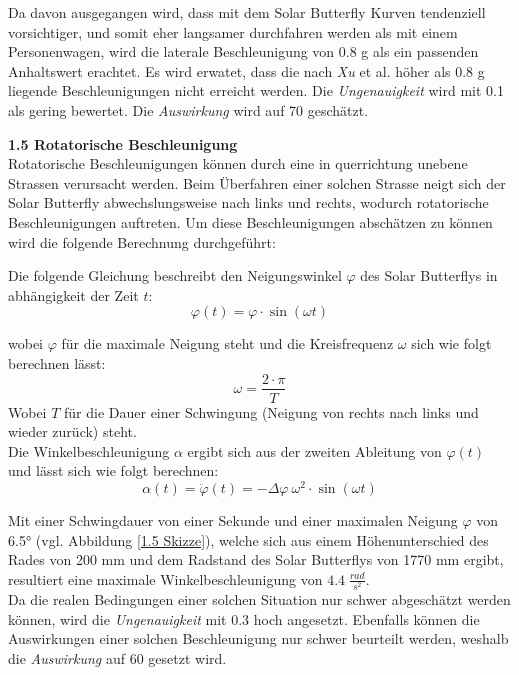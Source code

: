 \begin{description}
    Da davon ausgegangen wird, dass mit dem Solar Butterfly Kurven tendenziell vorsichtiger, und somit eher langsamer durchfahren werden als mit einem Personenwagen, wird die laterale Beschleunigung von 0.8 g als ein passenden Anhaltswert erachtet. Es wird erwatet, dass die nach \emph{Xu} et al. höher als 0.8 g liegende Beschleunigungen nicht erreicht werden. Die \emph{Ungenauigkeit} wird mit 0.1 als gering bewertet. Die \emph{Auswirkung} wird auf 70 geschätzt.

    \item \textbf{1.5 Rotatorische Beschleunigung}\\
    Rotatorische Beschleunigungen können durch eine in querrichtung unebene Strassen verursacht werden. Beim Überfahren einer solchen Strasse neigt sich der Solar Butterfly abwechslungsweise nach links und rechts, wodurch rotatorische Beschleunigungen auftreten. Um diese Beschleunigungen abschätzen zu können wird die folgende Berechnung durchgeführt:

    Die folgende Gleichung beschreibt den Neigungswinkel $\varphi$ des Solar Butterflys in abhängigkeit der Zeit $t$:
    \begin{equation}
      \varphi(t) =  \varphi \cdot \sin \left(\omega t \right)
    \end{equation}

    wobei $\varphi$ für die maximale Neigung steht und die Kreisfrequenz $\omega$ sich wie folgt berechnen lässt:
    \begin{equation}
      \omega = \frac{2\cdot \pi}{T}
    \end{equation}
    Wobei $T$ für die Dauer einer Schwingung (Neigung von rechts nach links und wieder zurück) steht.\\
    Die Winkelbeschleunigung $\alpha$ ergibt sich aus der zweiten Ableitung von $\varphi(t)$ und lässt sich wie folgt berechnen:
    \begin{equation}
      \alpha(t) = \ddot \varphi(t) = -\Delta\varphi\:\omega^2 \cdot \sin \left(\omega t \right)
    \end{equation}

    Mit einer Schwingdauer von einer Sekunde und einer maximalen Neigung $\varphi$ von 6.5° (vgl. Abbildung \ref{1.5 Skizze}), welche sich aus einem Höhenunterschied des Rades von 200 mm und dem Radstand des Solar Butterflys von 1770 mm ergibt, resultiert eine maximale Winkelbeschleunigung von $4.4 \; \frac{rad}{s^2}$.\\
    Da die realen Bedingungen einer solchen Situation nur schwer abgeschätzt werden können, wird die \emph{Ungenauigkeit} mit 0.3 hoch angesetzt. Ebenfalls können die Auswirkungen einer solchen Beschleunigung nur schwer beurteilt werden, weshalb die \emph{Auswirkung} auf 60 gesetzt wird.


\end{description}
